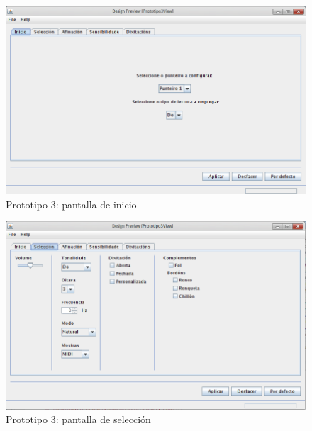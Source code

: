   \begin{figure}[htbp]
   \centering
   \includegraphics[scale=0.6,keepaspectratio=true]{./imagenes/prototipo3-1.png}
   \caption{Prototipo 3: pantalla de inicio}
   \label{figura:Prototipo3Inicio}
  \end{figure}

  \begin{figure}[htbp]
   \centering
   \includegraphics[scale=0.6,keepaspectratio=true]{./imagenes/prototipo3-2.png}
   \caption{Prototipo 3: pantalla de selección}
   \label{figura:Prototipo3Seleccion}
  \end{figure}

